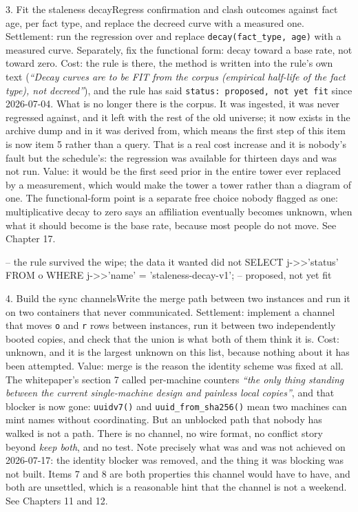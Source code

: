 \begin{Open}{3. Fit the staleness decay}{Regress confirmation and clash outcomes against fact age, per fact type, and replace the decreed curve with a measured one.}
Settlement: run the regression over \labCorpus{} and replace \texttt{decay(fact\_type, age)} with a measured curve. Separately, fix the functional form: decay toward a base rate, not toward zero. Cost: the rule is there, the method is written into the rule's own text (\textit{``Decay curves are to be FIT from the corpus (empirical half-life of the fact type), not decreed''}), and the rule has said \texttt{status: proposed, not yet fit} since 2026-07-04. What is no longer there is the corpus. It was ingested, it was never regressed against, and it left with the rest of the old universe; it now exists in the archive dump and in \labLineageSource{} it was derived from, which means the first step of this item is now item 5 rather than a query. That is a real cost increase and it is nobody's fault but the schedule's: the regression was available for thirteen days and was not run. Value: it would be the first seed prior in the entire tower ever replaced by a measurement, which would make the tower a tower rather than a diagram of one. The functional-form point is a separate free choice nobody flagged as one: multiplicative decay to zero says an affiliation eventually becomes unknown, when what it should become is the base rate, because most people do not move. See Chapter 17.
\begin{Check}
-- the rule survived the wipe; the data it wanted did not
SELECT j->>'status' FROM o WHERE j->>'name' = 'staleness-decay-v1';
  -- proposed, not yet fit
\end{Check}
\end{Open}

\begin{Open}{4. Build the sync channels}{Write the merge path between two instances and run it on two containers that never communicated.}
Settlement: implement a channel that moves \texttt{o} and \texttt{r} rows between instances, run it between two independently booted copies, and check that the union is what both of them think it is. Cost: unknown, and it is the largest unknown on this list, because nothing about it has been attempted. Value: merge is the reason the identity scheme was fixed at all. The whitepaper's section 7 called per-machine counters \textit{``the only thing standing between the current single-machine design and painless local copies''}, and that blocker is now gone: \texttt{uuidv7()} and \texttt{uuid\_from\_sha256()} mean two machines can mint names without coordinating. But an unblocked path that nobody has walked is not a path. There is no channel, no wire format, no conflict story beyond \textit{keep both}, and no test. Note precisely what was and was not achieved on 2026-07-17: the identity blocker was removed, and the thing it was blocking was not built. Items 7 and 8 are both properties this channel would have to have, and both are unsettled, which is a reasonable hint that the channel is not a weekend. See Chapters 11 and 12.
\end{Open}


